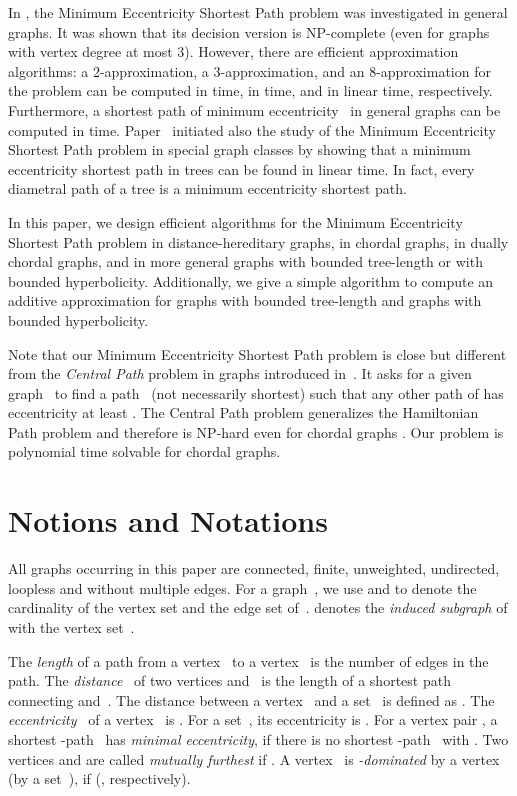 \documentclass[10pt]{llncs}
\begin{document}
In \cite{DrLei2015}, the Minimum Eccentricity Shortest Path problem was investigated in general graphs.
It was shown that its decision version is NP-complete (even for graphs with vertex degree at most 3).
However, there are efficient  approximation algorithms: a 2-approximation, a 3-approximation, and an 8-approximation for the problem can be computed in  time, in  time, and in linear time, respectively.
Furthermore, a shortest path of minimum eccentricity~ in general graphs can be computed in  time. 
Paper~\cite{DrLei2015} initiated also the study of the Minimum Eccentricity Shortest Path problem in special graph classes by showing that a minimum eccentricity shortest path in trees can be found in linear time.
In fact, every diametral path of a tree is a minimum eccentricity shortest path. 

In this paper, we design efficient algorithms for the Minimum Eccentricity Shortest Path problem in distance-hereditary graphs, in chordal graphs, in dually chordal graphs, and in more general graphs with bounded tree-length or with bounded hyperbolicity.
Additionally, we give a simple algorithm to compute an additive approximation for graphs with bounded tree-length and graphs with bounded hyperbolicity.

Note that our Minimum Eccentricity Shortest Path problem is close but different from the \emph{Central Path} problem in graphs introduced in~\cite{Slater}. 
It asks for a given graph~ to find a path~ (not necessarily shortest) such that any other path of  has eccentricity at least .
The Central Path problem generalizes the Hamiltonian Path problem and therefore is NP-hard even for chordal graphs \cite{haiko}.
Our problem is polynomial time solvable for chordal graphs. 

\section{Notions and Notations}
All graphs occurring in this paper are connected, finite, unweighted, undirected, loopless and without multiple edges. For a graph~, we use  and  to denote the cardinality of the vertex set and the edge set of~.
 denotes the \emph{induced subgraph} of  with the vertex set~. 

The \emph{length} of a path from a vertex~ to a vertex~ is the number of edges in the path. 
The \emph{distance}~ of two vertices  and~ is the length of a shortest path connecting  and~. 
The distance between a vertex~ and a set~ is defined as . 
The \emph{eccentricity}~ of a vertex~ is .
For a set~, its eccentricity is .
For a vertex pair , a shortest -path~ has \emph{minimal eccentricity}, if there is no shortest -path~ with .
Two vertices  and  are called \emph{mutually furthest} if . 
A vertex~ is \emph{-dominated} by a vertex~ (by a set~), if  (, respectively).
\end{document}
